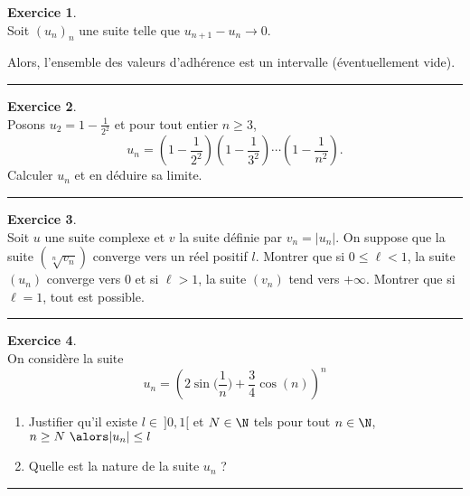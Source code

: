 \documentclass[a4paper,11pt]{article}
\theoremstyle{definition}
\newtheorem{exo}{Exercice} %
\begin{document}
	\begin{exo}\textit{}\quad\\[0.25cm]
	Soit $(u_n )_n$ une suite telle que $u_{n+1} - u_n \rightarrow 0$. 
	
	\noindent Alors, l'ensemble des valeurs d'adhérence est un intervalle (éventuellement vide).

	\centering
	\rule{1\linewidth}{0.6pt}
	\end{exo}
		
	
	\begin{exo}\textit{}\quad\\[0.25cm]
	Posons $  u_2=1-\frac{1}{2^2}$ et pour tout entier $n\geq 3$,
	\[
	u_n=\left(1-\frac{1}{2^2}\right)\left(1-\frac{1}{3^2}\right)\cdots\left(1-\frac{1}{n^2}\right).\]
	Calculer $u_n$ et en déduire sa limite. %
		
		
		\centering
		\rule{1\linewidth}{0.6pt}
	\end{exo}
	
	
	
	\begin{exo}\textit{}\quad\\
	Soit $u$ une suite complexe et $v$ la suite définie par $v_n=|u_n|$. On suppose que la suite $(\sqrt[n]{v_n})$ converge vers un réel positif $l$. Montrer que si $0\leq\ell<1$, la suite $(u_n)$ converge vers $0$ et si $\ell>1$, la suite $(v_n)$ tend vers $+\infty$.
	Montrer que si $\ell=1$, tout est possible.
		
		\centering
		\rule{1\linewidth}{0.6pt}
	\end{exo}
	
	\begin{exo}\quad\\
		On considère la suite $$u_n=\left(2\sin\big(\dfrac{1}{n}\big)+\dfrac{3}{4}\cos(n)\right)^n$$
		\begin{enumerate}
			\item Justifier qu'il existe $l\in \ ]0,1[$ et $N\in\N$
			tels pour tout $n\in\N$,\
			 $n\geq N \ \alors |u_n|\leq l$
			\item Quelle est la nature de la suite $u_n$ ?
		\end{enumerate}
		
		\centering
		\rule{1\linewidth}{0.6pt}
	\end{exo}
		


		
	
		
		
\end{document}
